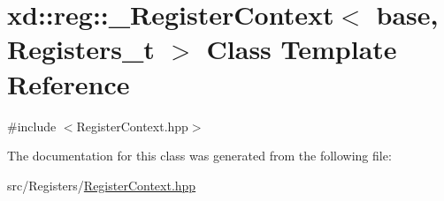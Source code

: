 \hypertarget{classxd_1_1reg_1_1___register_context}{}\section{xd\+:\+:reg\+:\+:\+\_\+\+Register\+Context$<$ base, Registers\+\_\+t $>$ Class Template Reference}
\label{classxd_1_1reg_1_1___register_context}


{\ttfamily \#include $<$Register\+Context.\+hpp$>$}



The documentation for this class was generated from the following file\+:\begin{DoxyCompactItemize}
\item 
src/\+Registers/\mbox{\hyperlink{_register_context_8hpp}{Register\+Context.\+hpp}}\end{DoxyCompactItemize}
